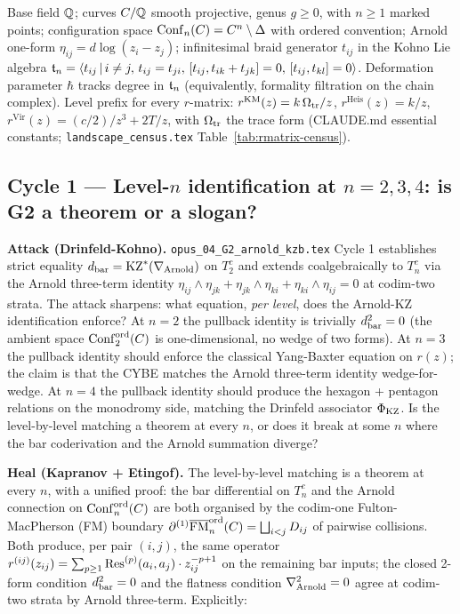 Base field $\QQ$; curves $C/\QQ$ smooth projective, genus $g \ge 0$,
with $n \ge 1$ marked points; configuration space
$\Conf_n(C) = C^n \setminus \Delta$ with ordered convention;
Arnold one-form $\eta_{ij} = d\log(z_i - z_j)$; infinitesimal braid
generator $t_{ij}$ in the Kohno Lie algebra
$\ft_n = \langle t_{ij}\,|\,i \ne j,\, t_{ij} = t_{ji},\, [t_{ij}, t_{ik} + t_{jk}] = 0,\, [t_{ij}, t_{kl}] = 0\rangle$.
Deformation parameter $\hbar$ tracks degree in $\ft_n$ (equivalently,
formality filtration on the chain complex). Level prefix for every
$r$-matrix: $r^{\mathrm{KM}}(z) = k\,\Omtr/z$,
$r^{\mathrm{Heis}}(z) = k/z$,
$r^{\mathrm{Vir}}(z) = (c/2)/z^3 + 2T/z$, with $\Omtr$ the trace form
(CLAUDE.md essential constants; \texttt{landscape\_census.tex}
Table~\ref{tab:rmatrix-census}).

\subsection*{Cycle 1 --- Level-$n$ identification at $n = 2, 3, 4$: is G2 a theorem or a slogan?}

\textbf{Attack (Drinfeld-Kohno).}
\texttt{opus\_04\_G2\_arnold\_kzb.tex} Cycle 1 establishes strict
equality $\dbar = \KZ^{*}(\nabla_{\Arnold})$ on $T^c_2$ and extends
coalgebraically to $T^c_n$ via the Arnold three-term identity
$\eta_{ij} \wedge \eta_{jk} + \eta_{jk} \wedge \eta_{ki} + \eta_{ki} \wedge \eta_{ij} = 0$
at codim-two strata. The attack sharpens: what equation, \emph{per level},
does the Arnold-KZ identification enforce? At $n = 2$ the pullback
identity is trivially $\dbar^2 = 0$ (the ambient space $\Confnord[2]{C}$
is one-dimensional, no wedge of two forms). At $n = 3$ the pullback
identity should enforce the classical Yang-Baxter equation on $r(z)$;
the claim is that the CYBE matches the Arnold three-term identity
wedge-for-wedge. At $n = 4$ the pullback identity should produce the
hexagon + pentagon relations on the monodromy side, matching the
Drinfeld associator $\Phi_{\KZ}$. Is the level-by-level matching a
theorem at every $n$, or does it break at some $n$ where the bar
coderivation and the Arnold summation diverge?

\textbf{Heal (Kapranov + Etingof).}
The level-by-level matching is a theorem at every $n$, with a unified
proof: the bar differential on $T^c_n$ and the Arnold connection on
$\Confnord[n]{C}$ are both organised by the codim-one Fulton-MacPherson
(FM) boundary $\partial^{(1)} \FM_n^{\mathrm{ord}}(C) = \bigsqcup_{i<j} D_{ij}$
of pairwise collisions. Both produce, per pair $(i,j)$, the same
operator $r^{(ij)}(z_{ij}) = \sum_{p \ge 1} \Res^{(p)}(a_i, a_j) \cdot z_{ij}^{-p+1}$
on the remaining bar inputs; the closed 2-form condition
$\dbar^2 = 0$ and the flatness condition $\nabla_{\Arnold}^2 = 0$ agree
at codim-two strata by Arnold three-term. Explicitly:

